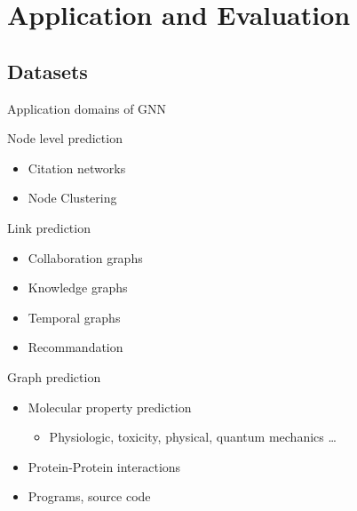 \documentclass[11pt]{beamer}
\begin{document}
\section{Application and Evaluation}
\subsection{Datasets}

\begin{frame}{Application domains of GNN}
  \begin{block}{Node level prediction}
    \begin{itemize}
    \item Citation networks
    \item Node Clustering
    \end{itemize}
  \end{block}

  \begin{block}{Link prediction}
    \begin{itemize}
    \item Collaboration graphs
    \item Knowledge graphs
    \item Temporal graphs
    \item Recommandation
    \end{itemize}
  \end{block}

  \begin{block}{Graph prediction}
    \begin{itemize}
    \item Molecular property prediction
      \begin{itemize}
      \item Physiologic, toxicity, physical, quantum mechanics \dots
      \end{itemize}
    \item Protein-Protein interactions
    \item Programs, source code
    \end{itemize}
  \end{block}
\end{frame}
\end{document}
